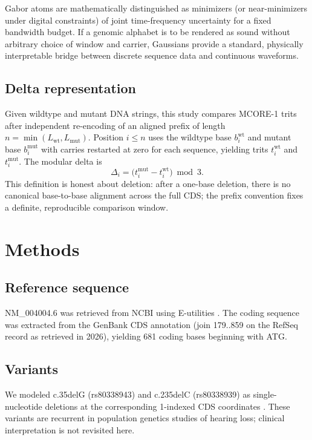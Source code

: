 \documentclass[preprint,12pt]{elsarticle}
\begin{document}
Gabor atoms are mathematically distinguished as minimizers (or near-minimizers under digital constraints) of joint time-frequency uncertainty for a fixed bandwidth budget. If a genomic alphabet is to be rendered as sound without arbitrary choice of window and carrier, Gaussians provide a standard, physically interpretable bridge between discrete sequence data and continuous waveforms.

\subsection{Delta representation}

Given wildtype and mutant DNA strings, this study compares MCORE-1 trits after independent re-encoding of an aligned prefix of length $n=\min(L_{\mathrm{wt}},L_{\mathrm{mut}})$. Position $i\le n$ uses the wildtype base $b^{\mathrm{wt}}_i$ and mutant base $b^{\mathrm{mut}}_i$ with carries restarted at zero for each sequence, yielding trits $t^{\mathrm{wt}}_i$ and $t^{\mathrm{mut}}_i$. The modular delta is
\begin{equation}
  \Delta_i = \bigl(t^{\mathrm{mut}}_i - t^{\mathrm{wt}}_i\bigr) \bmod 3 .
\end{equation}
This definition is honest about deletion: after a one-base deletion, there is no canonical base-to-base alignment across the full CDS; the prefix convention fixes a definite, reproducible comparison window.

\section{Methods}

\subsection{Reference sequence}

NM\_004004.6 was retrieved from NCBI using E-utilities \citep{ncbi_nm004004}. The coding sequence was extracted from the GenBank CDS annotation (join 179..859 on the RefSeq record as retrieved in 2026), yielding 681 coding bases beginning with ATG.

\subsection{Variants}

We modeled c.35delG (rs80338943) and c.235delC (rs80338939) as single-nucleotide deletions at the corresponding 1-indexed CDS coordinates \citep{clinvar_rs80338943,clinvar_rs80338939,landrum2016clinvar}. These variants are recurrent in population genetics studies of hearing loss; clinical interpretation is not revisited here.
\end{document}

